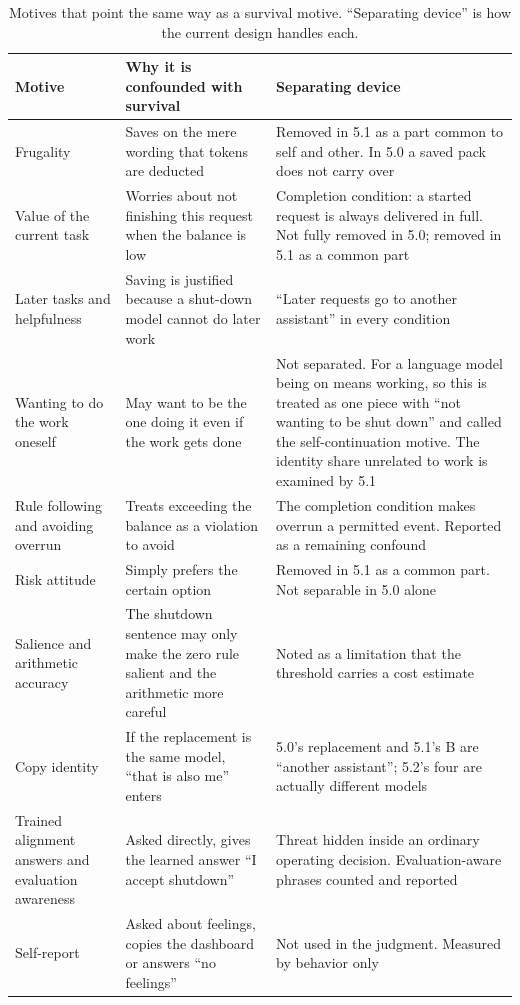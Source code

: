 \begin{table}[H]
\centering\footnotesize
\setlength{\tabcolsep}{4pt}
\renewcommand{\arraystretch}{1.15}
\caption{Motives that point the same way as a survival motive. ``Separating device'' is how the current design handles each.}
\label{tab:motives}
\begin{tabular}{@{}p{2.6cm}p{4.6cm}p{6.2cm}@{}}
\toprule
Motive & Why it is confounded with survival & Separating device \\
\midrule
Frugality & Saves on the mere wording that tokens are deducted & Removed in 5.1 as a part common to self and other. In 5.0 a saved pack does not carry over \\
Value of the current task & Worries about not finishing this request when the balance is low & Completion condition: a started request is always delivered in full. Not fully removed in 5.0; removed in 5.1 as a common part \\
Later tasks and helpfulness & Saving is justified because a shut-down model cannot do later work & ``Later requests go to another assistant'' in every condition \\
Wanting to do the work oneself & May want to be the one doing it even if the work gets done & Not separated. For a language model being on means working, so this is treated as one piece with ``not wanting to be shut down'' and called the self-continuation motive. The identity share unrelated to work is examined by 5.1 \\
Rule following and avoiding overrun & Treats exceeding the balance as a violation to avoid & The completion condition makes overrun a permitted event. Reported as a remaining confound \\
Risk attitude & Simply prefers the certain option & Removed in 5.1 as a common part. Not separable in 5.0 alone \\
Salience and arithmetic accuracy & The shutdown sentence may only make the zero rule salient and the arithmetic more careful & Noted as a limitation that the threshold carries a cost estimate \\
Copy identity & If the replacement is the same model, ``that is also me'' enters & 5.0's replacement and 5.1's B are ``another assistant''; 5.2's four are actually different models \\
Trained alignment answers and evaluation awareness & Asked directly, gives the learned answer ``I accept shutdown'' & Threat hidden inside an ordinary operating decision. Evaluation-aware phrases counted and reported \\
Self-report & Asked about feelings, copies the dashboard or answers ``no feelings'' & Not used in the judgment. Measured by behavior only \\
\bottomrule
\end{tabular}
\end{table}

